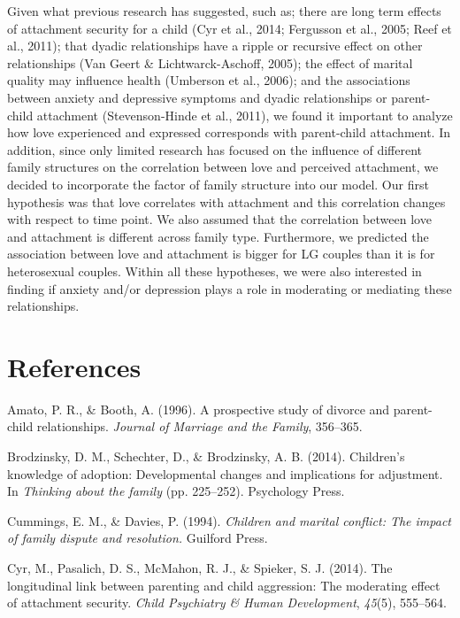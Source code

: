 \documentclass[man]{apa6}
\begin{document}
Given what previous research has suggested, such as; there are long term effects of attachment security for a child (Cyr et al., 2014; Fergusson et al., 2005; Reef et al., 2011); that dyadic relationships have a ripple or recursive effect on other relationships (Van Geert \& Lichtwarck-Aschoff, 2005); the effect of marital quality may influence health (Umberson et al., 2006); and the associations between anxiety and depressive symptoms and dyadic relationships or parent-child attachment (Stevenson-Hinde et al., 2011), we found it important to analyze how love experienced and expressed corresponds with parent-child attachment. In addition, since only limited research has focused on the influence of different family structures on the correlation between love and perceived attachment, we decided to incorporate the factor of family structure into our model. Our first hypothesis was that love correlates with attachment and this correlation changes with respect to time point. We also assumed that the correlation between love and attachment is different across family type. Furthermore, we predicted the association between love and attachment is bigger for LG couples than it is for heterosexual couples. Within all these hypotheses, we were also interested in finding if anxiety and/or depression plays a role in moderating or mediating these relationships.

\newpage

\hypertarget{references}{%
\section*{References}\label{references}}

\hypertarget{refs}{}
\leavevmode\hypertarget{ref-amato1996prospective}{}%
Amato, P. R., \& Booth, A. (1996). A prospective study of divorce and parent-child relationships. \emph{Journal of Marriage and the Family}, 356--365.

\leavevmode\hypertarget{ref-brodzinsky2014children}{}%
Brodzinsky, D. M., Schechter, D., \& Brodzinsky, A. B. (2014). Children's knowledge of adoption: Developmental changes and implications for adjustment. In \emph{Thinking about the family} (pp. 225--252). Psychology Press.

\leavevmode\hypertarget{ref-cummings1994children}{}%
Cummings, E. M., \& Davies, P. (1994). \emph{Children and marital conflict: The impact of family dispute and resolution.} Guilford Press.

\leavevmode\hypertarget{ref-study3}{}%
Cyr, M., Pasalich, D. S., McMahon, R. J., \& Spieker, S. J. (2014). The longitudinal link between parenting and child aggression: The moderating effect of attachment security. \emph{Child Psychiatry \& Human Development}, \emph{45}(5), 555--564.
\end{document}
